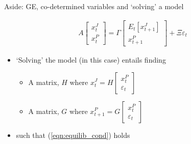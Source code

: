 \begin{frame}{Aside: GE, co-determined variables and `solving' a model}

\begin{gather}
 A \begin{bmatrix} x^{J}_{t} \\ x^{P}_{t} \end{bmatrix}
 =
 \Gamma 
  \begin{bmatrix}
   E_{t}[ x^{J}_{t+1} ] \\ x^{P}_{t+1}
   \end{bmatrix}
 + 
 \Xi \varepsilon_{t} \label{eqn:equilib_cond}
\end{gather}
\begin{itemize}
\item	`Solving' the model (in this case) entails finding
	\begin{itemize}
	\item	A matrix, $H$ where $x^{J}_{t}= H \begin{bmatrix} x^{P}_{t} \\ \varepsilon_{t} \end{bmatrix}$
	\item	A matrix, $G$ where $x^{P}_{t+1}= G \begin{bmatrix} x^{P}_{t} \\ \varepsilon_{t} \end{bmatrix}$
	\end{itemize}
\item[]	such that (\ref{eqn:equilib_cond}) holds
\end{itemize}

\end{frame}


